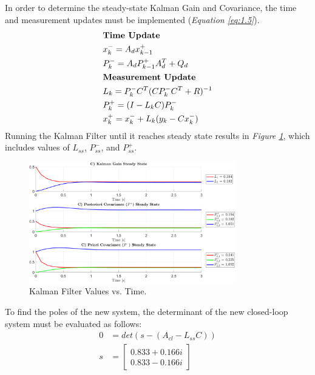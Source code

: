 \documentclass[10pt]{article}
\begin{document}
\begin{enumerate}[label=\textbf{\arabic*.}]
  In order to determine the steady-state Kalman Gain and Covariance, the time 
  and  measurement updates must be implemented 
  (\emph{Equation \ref{eq:1.5}}).
  \begin{equation}
    \begin{split}
      &\text{\bf{Time Update}} \\
      &x_k^- = A_d x_{k-1}^+ \\
      &P_k^- = A_d P_{k-1}^+ A_d^T + Q_d \\
      &\text{\bf{Measurement Update}} \\
      &L_k = P_k^- C^T (C P_k^- C^T + R)^{-1} \\
      &P_k^+ = (I - L_k C) P_k^- \\
      &x_k^+ = x_k^- + L_k (y_k - C x_k^-)
    \end{split}
    \label{eq:1.5}
  \end{equation}
  Running the Kalman Filter until it reaches steady state results in 
  \emph{Figure \ref{f:1.2}}, which includes values of $L_{ss}$, $P_{ss}^-$, 
  and $P_{ss}^+$.
  \begin{figure}[H]
    \centering
    \includegraphics[width=0.8\textwidth]{p1_c.png}
    \caption{Kalman Filter Values vs. Time.}
    \label{f:1.2}
  \end{figure}
  To find the poles of the new system, the determinant of the new closed-loop 
  system must be evaluated as follows:
  \begin{equation}
    \begin{split}
      0 &= det(s - (A_{cl}-L_{ss}C)) \\
      s &= \begin{bmatrix} 0.833+0.166i \\ 0.833-0.166i \end{bmatrix}
    \end{split}
    \label{eq:1.6}
  \end{equation}


\end{enumerate}
\end{document}
